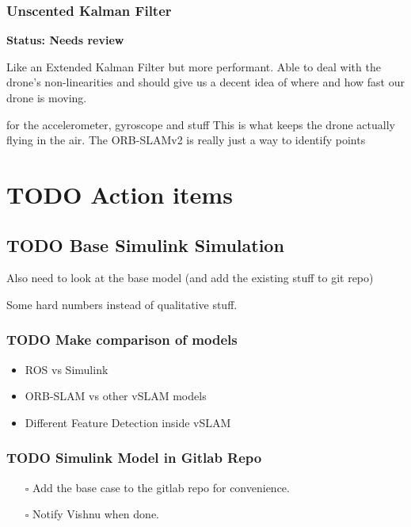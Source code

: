 \documentclass[unrestricted]{meetingnotesminutes}
\begin{document}
\subsubsection{Unscented Kalman Filter}
\label{sec:org9c71e41}
\textbf{Status: Needs review}

Like an Extended Kalman Filter but more performant.
Able to deal with the drone's non-linearities and should give us a decent idea of where and how fast our drone is moving.

for the accelerometer, gyroscope and stuff
This is what keeps the drone actually flying in the air.
The ORB-SLAMv2 is really just a way to identify points

\section{{\bfseries\sffamily TODO} Action items}
\label{sec:orgdf38218}

\subsection{{\bfseries\sffamily TODO} Base Simulink Simulation}
\label{sec:org31c6ec2}
Also need to look at the base model (and add the existing stuff to git repo)

Some hard numbers instead of qualitative stuff.

\subsubsection{{\bfseries\sffamily TODO} Make comparison of models}
\label{sec:org4c5e95f}
\begin{itemize}
\item ROS vs Simulink
\item ORB-SLAM vs other vSLAM models
\item Different Feature Detection inside vSLAM
\end{itemize}

\subsubsection{{\bfseries\sffamily TODO} Simulink Model in Gitlab Repo}
\label{sec:org56feafc}
\begin{itemize}
\item[{$\square$}] Add the base case to the gitlab repo for convenience.
\item[{$\square$}] Notify Vishnu when done.
\end{itemize}
\end{document}
